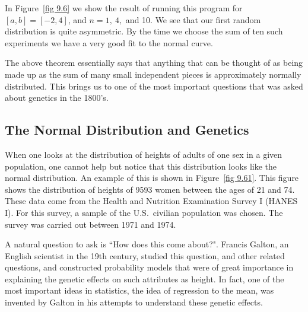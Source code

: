 
In Figure~\ref{fig 9.6} we show the result of running this
program for $[a, b] = [-2, 4]$, and $n = 1,\ 4,$ and 10.  We see that our first random
distribution is quite asymmetric.  By the time we choose the sum of ten such
experiments we have a very good fit to the normal curve.
\par
The above theorem essentially says that anything that can be thought of as being made up as the
sum of many small independent pieces is approximately normally distributed.  This brings us to
one of the most important questions that was asked about genetics in the 1800's.


\subsection*{The Normal Distribution and Genetics}
When one looks at the distribution of heights of adults of one sex
in a given population, one cannot help but notice that this distribution looks like the normal
distribution.  An example of this is shown in Figure~\ref{fig 9.61}.  This figure shows the
distribution of heights of 9593 women between the ages of 21 and 74.  These
data come from the Health and Nutrition Examination Survey I (HANES I).
For this survey, a sample of the U.S.\ civilian population was chosen.  The survey
was carried out between 1971 and 1974.
\par
A natural question to ask is ``How does this come about?".  Francis Galton, an English scientist in the 19th century, studied this question, and other related
questions, and constructed probability models that were of great importance in explaining
the genetic effects on such attributes as height.  In fact, one of the most important ideas
in statistics, the idea of regression to the mean, was
invented by Galton in his attempts to understand these genetic effects.
 
